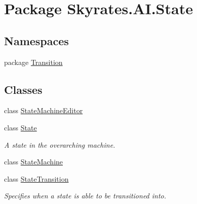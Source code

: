 \hypertarget{namespace_skyrates_1_1_a_i_1_1_state}{\section{Package Skyrates.\-A\-I.\-State}
\label{namespace_skyrates_1_1_a_i_1_1_state}
}
\subsection*{Namespaces}
\begin{DoxyCompactItemize}
\item 
package \hyperlink{namespace_skyrates_1_1_a_i_1_1_state_1_1_transition}{Transition}
\end{DoxyCompactItemize}
\subsection*{Classes}
\begin{DoxyCompactItemize}
\item 
class \hyperlink{class_skyrates_1_1_a_i_1_1_state_1_1_state_machine_editor}{State\-Machine\-Editor}
\item 
class \hyperlink{class_skyrates_1_1_a_i_1_1_state_1_1_state}{State}
\begin{DoxyCompactList}\small\item\em A state in the overarching machine. \end{DoxyCompactList}\item 
class \hyperlink{class_skyrates_1_1_a_i_1_1_state_1_1_state_machine}{State\-Machine}
\item 
class \hyperlink{class_skyrates_1_1_a_i_1_1_state_1_1_state_transition}{State\-Transition}
\begin{DoxyCompactList}\small\item\em Specifies when a state is able to be transitioned into. \end{DoxyCompactList}\end{DoxyCompactItemize}

